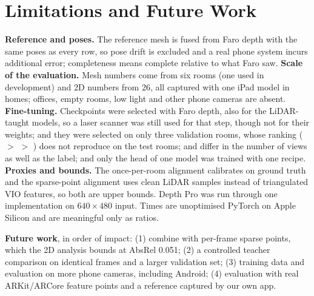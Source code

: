 \section{Limitations and Future Work}\label{sec:limitations}
\textbf{Reference and poses.} The reference mesh is fused from Faro depth with the same poses as every row, so pose
drift is excluded and a real phone system incurs additional error; completeness means complete relative to what Faro
saw. \textbf{Scale of the evaluation.} Mesh numbers come from six rooms (one used in development) and 2D numbers from
26, all captured with one iPad model in homes; offices, empty rooms, low light and other phone cameras are absent.
\textbf{Fine-tuning.} Checkpoints were selected with Faro depth, also for the LiDAR-taught models, so a laser
scanner was still used for that step, though not for their weights; and they were selected on only three validation rooms, whose ranking (\ftmain{} $>$ \ftlidar{} $>$ \ftfaro{}) does
not reproduce on the test rooms; \ftfaro{} and \ftlidar{} differ in the number of views as well as the label; and only the head of one
model was trained with one recipe. \textbf{Proxies and bounds.} The once-per-room alignment calibrates on ground truth and
the sparse-point alignment uses clean LiDAR samples instead of triangulated VIO features, so both are upper bounds.
Depth Pro was run through one implementation on $640\times480$ input. Times are unoptimised PyTorch on Apple Silicon
and are meaningful only as ratios.

\textbf{Future work}, in order of impact: (1) combine \ftmain{} with per-frame sparse points, which the 2D analysis bounds at
AbsRel 0.051; (2) a controlled teacher comparison on identical frames and a larger validation set; (3) training data
and evaluation on more phone cameras, including Android; (4) evaluation with real ARKit/ARCore feature points and a
reference captured by our own app.
